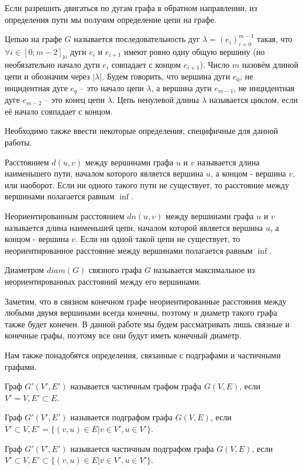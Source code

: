 Если разрешить двигаться по дугам графа в обратном направлении, из определения пути мы получим определение цепи на графе.

\begin{defn}
	Цепью на графе $G$ называется последовательность дуг $\lambda = (e_i)_{i = 0}^{m-1}$ такая, что $\forall i \in [0;m-2]_\mathbb{N}$ дуги $e_i$ и $e_{i+1}$ имеют ровно одну общую вершину (но необязательно начало дуги $e_i$ совпадает с концом $e_{i+1}$). Число $m$ назовём длиной цепи и обозначим через $|\lambda|$. Будем говорить, что вершина дуги $e_0$, не инцидентная дуге $e_q$ -- это начало цепи $\lambda$, а вершина дуги $e_{m-1}$, не инцидентная дуге $e_{m-2}$ -- это конец цепи $\lambda$. Цепь ненулевой длины $\lambda$ называется циклом, если её начало совпадает с концом.
\end{defn} 

Необходимо также ввести некоторые определения, специфичные для данной работы.

\begin{defn}
	Расстоянием $d(u, v)$ между вершинами графа $u$ и $v$ называется длина наименьшего пути, началом которого является вершина $u$, а концом - вершина $v$, или наоборот. Если ни одного такого пути не существует, то расстояние между вершинами полагается равным $\inf$.
\end{defn}

\begin{defn}
	Неориентированным расстоянием $dn(u, v)$ между вершинами графа $u$ и $v$ называется длина наименьшей цепи, началом которой является вершина $u$, а концом - вершина $v$. Если ни одной такой цепи не существует, то неориентированное расстояние между вершинами полагается равным $\inf$.
\end{defn}

\begin{defn}
	Диаметром $diam(G)$ связного графа $G$ называется максимальное из неориентированных расстояний между его вершинами.
\end{defn}

Заметим, что в связном конечном графе неориентированные расстояния между любыми двумя вершинами всегда конечны, поэтому и диаметр такого графа также будет конечен. В данной работе мы будем рассматривать лишь связные и конечные графы, поэтому все они будут иметь конечный диаметр.

Нам также понадобятся определения, связанные с подграфами и частичными графами.

\begin{defn}
	 Граф $G'(V', E')$ называется частичным графом графа $G(V, E)$, если $V' = V, E' \subset E$.
\end{defn}

\begin{defn}
	Граф $G'(V', E')$ называется подграфом графа $G(V, E)$, если $V' \subset V, E' = \{(v, u) \in E | v \in V', u \in V'\}$.
\end{defn}

\begin{defn}
	Граф $G'(V', E')$ называется частичным подграфом графа $G(V, E)$, если $V' \subset V, E' \subset \{(v, u) \in E | v \in V', u \in V'\}$.
\end{defn}
